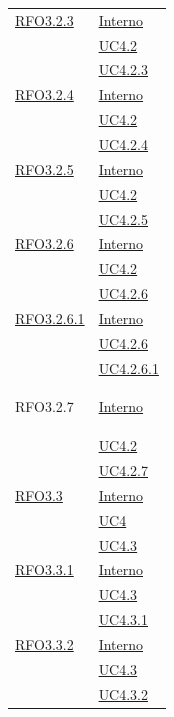 \begin{itemize}
\begin{itemize}
\begin{itemize}
\begin{itemize}
\begin{longtable}{|>{\centering}m{5cm}|m{5cm}<{\centering}|}
\hyperlink{RFO3.2.3}{RFO3.2.3} & \hyperlink{Interno}{Interno}\\
& \hyperref[UC4.2]{UC4.2}\\
& \hyperref[UC4.2.3]{UC4.2.3}\\ \hline

\hyperlink{RFO3.2.4}{RFO3.2.4} & \hyperlink{Interno}{Interno}\\
& \hyperref[UC4.2]{UC4.2}\\
& \hyperref[UC4.2.4]{UC4.2.4}\\ \hline

\hyperlink{RFO3.2.5}{RFO3.2.5} & \hyperlink{Interno}{Interno}\\
& \hyperref[UC4.2]{UC4.2}\\
& \hyperref[UC4.2.5]{UC4.2.5}\\ \hline

\hyperlink{RFO3.2.6}{RFO3.2.6} & \hyperlink{Interno}{Interno}\\
& \hyperref[UC4.2]{UC4.2}\\
& \hyperref[UC4.2.6]{UC4.2.6}\\ \hline

\hyperlink{RFO3.2.6.1}{RFO3.2.6.1} & \hyperlink{Interno}{Interno}\\
& \hyperref[UC4.2.6]{UC4.2.6}\\
& \hyperref[UC4.2.6.1]{UC4.2.6.1}\\ \hline

\hypertarget{RFO3.2.7}{RFO3.2.7} &\hyperlink{Interno}{Interno}\\
&\hyperref[UC4.2]{UC4.2}\\
&\hyperref[UC4.2.7]{UC4.2.7}\\ \hline

\hyperlink{RFO3.3}{RFO3.3} & \hyperlink{Interno}{Interno}\\
& \hyperref[UC4]{UC4}\\
& \hyperref[UC4.3]{UC4.3}\\ \hline

\hyperlink{RFO3.3.1}{RFO3.3.1} & \hyperlink{Interno}{Interno}\\
& \hyperref[UC4.3]{UC4.3}\\
& \hyperref[UC4.3.1]{UC4.3.1}\\ \hline

\hyperlink{RFO3.3.2}{RFO3.3.2} & \hyperlink{Interno}{Interno}\\
& \hyperref[UC4.3]{UC4.3}\\
& \hyperref[UC4.3.2]{UC4.3.2}\\ \hline


\end{longtable}
\end{itemize}
\end{itemize}
\end{itemize}
\end{itemize}
